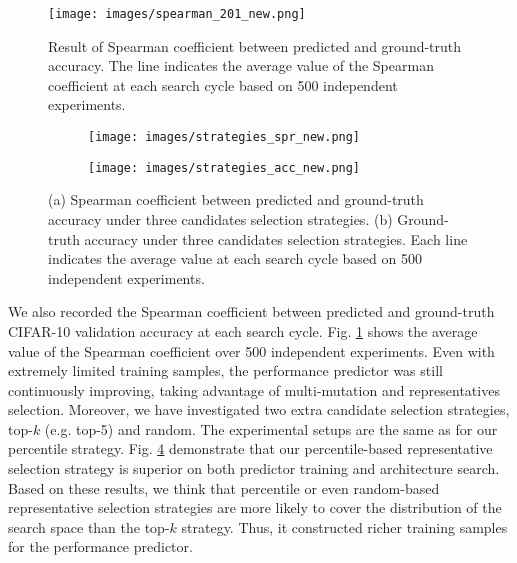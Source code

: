\documentclass[sigconf]{acmart}
\begin{document}
 \begin{figure}[!h]
\centering
  	\texttt{[image: images/spearman\_201\_new.png]}
  	\caption{Result of Spearman coefficient between predicted and ground-truth accuracy. The line indicates the average value of the Spearman coefficient at each search cycle based on 500 independent experiments.
  	}
  	\label{spearman201}
\end{figure}

\begin{figure}[!h]
\begin{subfigure}{.45\textwidth}
  \centering
  \texttt{[image: images/strategies\_spr\_new.png]}
  \caption{}
  \label{strategy_spr}
  \end{subfigure}
\begin{subfigure}{.45\textwidth}
  \centering
  \texttt{[image: images/strategies\_acc\_new.png]} 
  \caption{}
  \label{strategy_acc}
  \end{subfigure}
\caption{(a) Spearman coefficient between predicted and ground-truth accuracy under three candidates selection strategies. (b) Ground-truth accuracy under three candidates selection strategies. Each line indicates the average value at each search cycle based on 500 independent experiments.
}
\label{strategy_compare}
\end{figure}









We also recorded the Spearman coefficient between predicted and ground-truth CIFAR-10 validation accuracy at each search cycle.  Fig. \ref{spearman201} shows the average value of the Spearman coefficient over 500 independent experiments.  Even with extremely limited training samples, the performance predictor was still continuously improving, taking advantage of multi-mutation and representatives selection.  Moreover, we have investigated two extra candidate selection strategies, top-$k$ (e.g. top-5) and random. The experimental setups are the same as for our percentile strategy.  Fig. \ref{strategy_compare} demonstrate that our percentile-based representative selection strategy is superior on both predictor training and architecture search. Based on these results, we think that percentile or even random-based representative selection strategies are more likely to cover the distribution of the search space than the top-$k$ strategy. Thus, it constructed richer training samples for the performance predictor.
\end{document}
